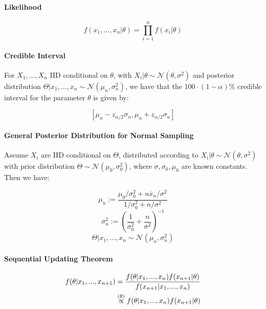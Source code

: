 \documentclass[a4paper]{article}
\begin{document}
            \paragraph{Likelihood}
                \[
                    f(x_1, ..., x_n | \theta) = \prod_{i=1}^n f(x_i | \theta)
                \]

            \paragraph{Credible Interval}
                For $X_1, ..., X_n$ IID conditional on $\theta$, with $X_i |
                \theta \sim \mathcal{N}(\theta, \sigma^2)$ and posterior
                distribution $\Theta | x_1, ..., x_n \sim \mathcal{N}(\mu_n,
                \sigma_n^2)$, we have that the $100 \cdot (1 - \alpha)\%$
                credible interval for the parameter $\theta$ is given by:

                \[
                    \left[\mu_n - z_{\alpha/2}\sigma_n, \mu_n + z_{\alpha/2}
                    \sigma_n\right]
                \]

            \paragraph{General Posterior Distribution for Normal Sampling}
                Assume $X_i$ are IID conditional on $\Theta$, distributed
                according to $X_i | \theta \sim \mathcal{N}(\theta, \sigma^2)$
                with prior distribution $\Theta \sim \mathcal{N}(\mu_0,
                \sigma_0^2)$, where $\sigma, \sigma_0, \mu_0$ are known
                constants. Then we have:

                \[
                    \mu_n := \frac{\mu_0/\sigma_0^2 + n\overline x_n/\sigma^2}
                    {1/\sigma_0^2 + n/\sigma^2}
                \]
                \[
                    \sigma_n^2 := \left(\frac{1}{\sigma_0^2} +
                    \frac{n}{\sigma^2}\right)^{-1}
                \]
                \[
                    \Theta | x_1, ..., x_n \sim \mathcal{N}(\mu_n, \sigma_n^2)
                \]

            \paragraph{Sequential Updating Theorem}
                \begin{align*}
                    f(\theta | x_1, ..., x_{n+1}) & = \frac{f(\theta | x_1, ...,
                        x_n)f(x_{n+1} | \theta)}{f(x_{n+1} | x_1, ..., x_n)} \\
                    & \stackrel{({\theta})}{\propto} f(\theta | x_1, ..., x_n)f(x_{n+1} |
                        \theta)
                \end{align*}
\end{document}
